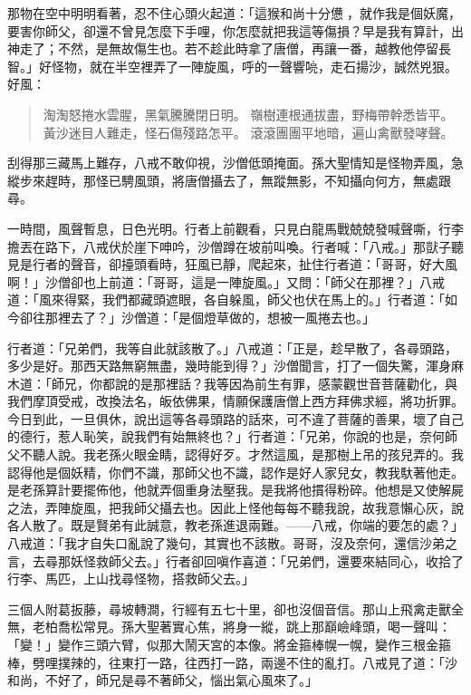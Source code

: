 那物在空中明明看著，忍不住心頭火起道：「這猴和尚十分憊𪬯，就作我是個妖魔，要害你師父，卻還不曾見怎麼下手哩，你怎麼就把我這等傷損？早是我有算計，出神走了；不然，是無故傷生也。若不趁此時拿了唐僧，再讓一番，越教他停留長智。」好怪物，就在半空裡弄了一陣旋風，呼的一聲響喨，走石揚沙，誠然兇狠。好風：
\begin{quote}
淘淘怒捲水雲腥，黑氣騰騰閉日明。
嶺樹連根通拔盡，野梅帶幹悉皆平。
黃沙迷目人難走，怪石傷殘路怎平。
滾滾團團平地暗，遍山禽獸發哮聲。
\end{quote}

刮得那三藏馬上難存，八戒不敢仰視，沙僧低頭掩面。孫大聖情知是怪物弄風，急縱步來趕時，那怪已騁風頭，將唐僧攝去了，無蹤無影，不知攝向何方，無處跟尋。

一時間，風聲暫息，日色光明。行者上前觀看，只見白龍馬戰兢兢發喊聲嘶，行李擔丟在路下，八戒伏於崖下呻吟，沙僧蹲在坡前叫喚。行者喊：「八戒。」那獃子聽見是行者的聲音，卻擡頭看時，狂風已靜，爬起來，扯住行者道：「哥哥，好大風啊！」沙僧卻也上前道：「哥哥，這是一陣旋風。」又問：「師父在那裡？」八戒道：「風來得緊，我們都藏頭遮眼，各自躲風，師父也伏在馬上的。」行者道：「如今卻往那裡去了？」沙僧道：「是個燈草做的，想被一風捲去也。」

行者道：「兄弟們，我等自此就該散了。」八戒道：「正是，趁早散了，各尋頭路，多少是好。那西天路無窮無盡，幾時能到得？」沙僧聞言，打了一個失驚，渾身麻木道：「師兄，你都說的是那裡話？我等因為前生有罪，感蒙觀世音菩薩勸化，與我們摩頂受戒，改換法名，皈依佛果，情願保護唐僧上西方拜佛求經，將功折罪。今日到此，一旦俱休，說出這等各尋頭路的話來，可不違了菩薩的善果，壞了自己的德行，惹人恥笑，說我們有始無終也？」行者道：「兄弟，你說的也是，奈何師父不聽人說。我老孫火眼金睛，認得好歹。才然這風，是那樹上吊的孩兒弄的。我認得他是個妖精，你們不識，那師父也不識，認作是好人家兒女，教我馱著他走。是老孫算計要擺佈他，他就弄個重身法壓我。是我將他摜得粉碎。他想是又使解屍之法，弄陣旋風，把我師父攝去也。因此上怪他每每不聽我說，故我意懶心灰，說各人散了。既是賢弟有此誠意，教老孫進退兩難。——八戒，你端的要怎的處？」八戒道：「我才自失口亂說了幾句，其實也不該散。哥哥，沒及奈何，還信沙弟之言，去尋那妖怪救師父去。」行者卻回嗔作喜道：「兄弟們，還要來結同心，收拾了行李、馬匹，上山找尋怪物，搭救師父去。」

三個人附葛扳藤，尋坡轉澗，行經有五七十里，卻也沒個音信。那山上飛禽走獸全無，老柏喬松常見。孫大聖著實心焦，將身一縱，跳上那巔嶮峰頭，喝一聲叫：「變！」變作三頭六臂，似那大鬧天宮的本像。將金箍棒幌一幌，變作三根金箍棒，劈哩撲辣的，往東打一路，往西打一路，兩邊不住的亂打。八戒見了道：「沙和尚，不好了，師兄是尋不著師父，惱出氣心風來了。」

